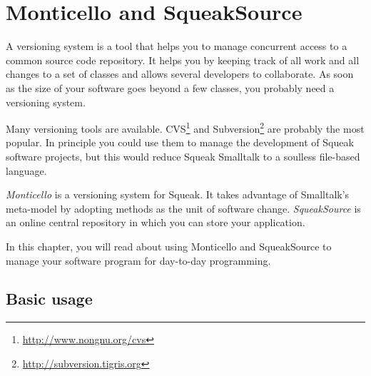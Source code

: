 \documentclass[a4paper,10pt,twoside]{book}
\begin{document}
	\sloppy
\fi

\newcommand{\figlabel}[1]{\label{fig:#1}}
\newcommand{\seclabel}[1]{\label{sec:#1}}

\chapter{Monticello and SqueakSource}



A versioning system is a tool that helps you to manage concurrent access to a common source code repository. It helps you by keeping track of all work and all changes to a set of classes and allows several developers to collaborate. As soon as the size of your software goes beyond a few classes, you probably need a versioning system.

Many versioning tools are available. CVS\footnote{\url{http://www.nongnu.org/cvs}} and Subversion\footnote{\url{http://subversion.tigris.org}} are probably the most popular.
In principle you could use them to manage the development of Squeak software projects, but this would reduce Squeak Smalltalk to a soulless file-based language. 

\emph{Monticello} is a versioning system for Squeak. It takes advantage of Smalltalk's meta-model by adopting methods as the unit of software change. \emph{SqueakSource} is an online central repository in which you can store your application.

In this chapter, you will read about using Monticello and SqueakSource to manage your software program for day-to-day programming.


\section{Basic usage}
\end{document}
